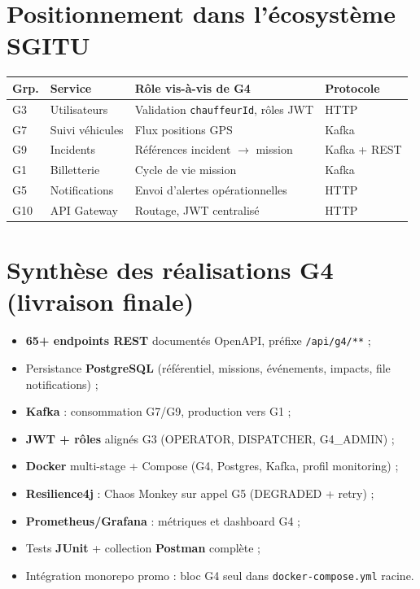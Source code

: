 \documentclass[12pt,a4paper]{report}
\begin{document}
\section{Positionnement dans l'écosystème SGITU}
\begin{center}
\small
\begin{tabular}{@{}p{1.2cm}p{3.2cm}p{5.5cm}p{2.2cm}@{}}
\toprule
\textbf{Grp.} & \textbf{Service} & \textbf{Rôle vis-à-vis de G4} & \textbf{Protocole} \\
\midrule
G3 & Utilisateurs & Validation \texttt{chauffeurId}, rôles JWT & HTTP \\
G7 & Suivi véhicules & Flux positions GPS & Kafka \\
G9 & Incidents & Références incident $\rightarrow$ mission & Kafka + REST \\
G1 & Billetterie & Cycle de vie mission & Kafka \\
G5 & Notifications & Envoi d'alertes opérationnelles & HTTP \\
G10 & API Gateway & Routage, JWT centralisé & HTTP \\
\bottomrule
\end{tabular}
\end{center}

\section{Synthèse des réalisations G4 (livraison finale)}
\begin{tcolorbox}[colback=ensablue!5, colframe=ensablue, title=\textbf{Travaux livrés}]
\begin{itemize}[leftmargin=*]
    \item \textbf{65+ endpoints REST} documentés OpenAPI, préfixe \texttt{/api/g4/**} ;
    \item Persistance \textbf{PostgreSQL} (référentiel, missions, événements, impacts, file notifications) ;
    \item \textbf{Kafka} : consommation G7/G9, production vers G1 ;
    \item \textbf{JWT + rôles} alignés G3 (OPERATOR, DISPATCHER, G4\_ADMIN) ;
    \item \textbf{Docker} multi-stage + Compose (G4, Postgres, Kafka, profil monitoring) ;
    \item \textbf{Resilience4j} : Chaos Monkey sur appel G5 (DEGRADED + retry) ;
    \item \textbf{Prometheus/Grafana} : métriques et dashboard G4 ;
    \item Tests \textbf{JUnit} + collection \textbf{Postman} complète ;
    \item Intégration monorepo promo : bloc G4 seul dans \texttt{docker-compose.yml} racine.
\end{itemize}
\end{tcolorbox}
\end{document}
